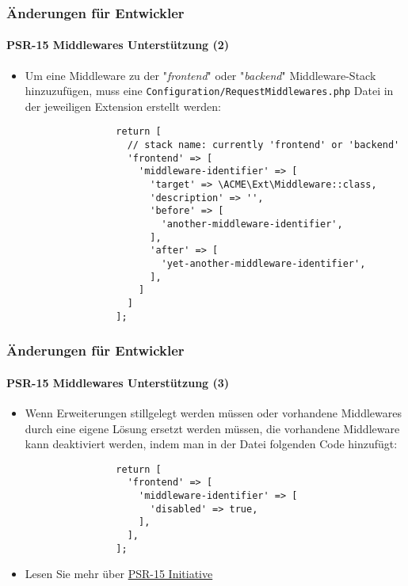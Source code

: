 \begin{frame}[fragile]
	\frametitle{Änderungen für Entwickler}
	\framesubtitle{PSR-15 Middlewares Unterstützung (2)}

	\lstset{basicstyle=\tiny\ttfamily}

	\begin{itemize}
		\item Um eine Middleware zu der "\textit{frontend}" oder "\textit{backend}"
			Middleware-Stack hinzuzufügen, muss eine \texttt{Configuration/RequestMiddlewares.php}
			Datei in der jeweiligen Extension erstellt werden:

			\begin{lstlisting}
				return [
				  // stack name: currently 'frontend' or 'backend'
				  'frontend' => [
				    'middleware-identifier' => [
				      'target' => \ACME\Ext\Middleware::class,
				      'description' => '',
				      'before' => [
				        'another-middleware-identifier',
				      ],
				      'after' => [
				        'yet-another-middleware-identifier',
				      ],
				    ]
				  ]
				];
			\end{lstlisting}

	\end{itemize}

\end{frame}


\begin{frame}[fragile]
	\frametitle{Änderungen für Entwickler}
	\framesubtitle{PSR-15 Middlewares Unterstützung (3)}

	\lstset{basicstyle=\tiny\ttfamily}

	\begin{itemize}

		\item Wenn Erweiterungen stillgelegt werden müssen oder vorhandene Middlewares durch eine eigene Lösung ersetzt werden 
			müssen, die vorhandene Middleware kann deaktiviert werden, indem man in der Datei
			folgenden Code hinzufügt:

			\begin{lstlisting}
				return [
				  'frontend' => [
				    'middleware-identifier' => [
				      'disabled' => true,
				    ],
				  ],
				];
			\end{lstlisting}

		\item Lesen Sie mehr über \href{https://new.typo3.org/community/teams/typo3-development/initiatives/initiative-psr-15/}{PSR-15 Initiative} 

	\end{itemize}

\end{frame}

